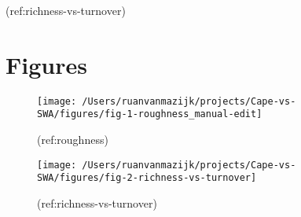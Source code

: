(ref:richness-vs-turnover)

\hypertarget{figures}{%
\section*{Figures}\label{figures}}

\begin{figure}[H]
\texttt{[image: /Users/ruanvanmazijk/projects/Cape-vs-SWA/figures/fig-1-roughness\_manual-edit]} \caption{(ref:roughness)}\label{fig:roughness}
\end{figure}

\begin{figure}[H]
\texttt{[image: /Users/ruanvanmazijk/projects/Cape-vs-SWA/figures/fig-2-richness-vs-turnover]} \caption{(ref:richness-vs-turnover)}\label{fig:richness-vs-turnover}
\end{figure}
